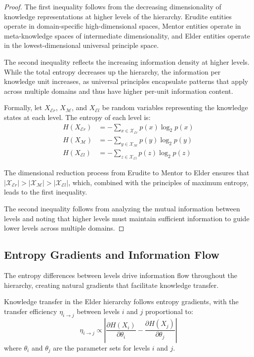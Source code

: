 \begin{proof}
The first inequality follows from the decreasing dimensionality of knowledge representations at higher levels of the hierarchy. Erudite entities operate in domain-specific high-dimensional spaces, Mentor entities operate in meta-knowledge spaces of intermediate dimensionality, and Elder entities operate in the lowest-dimensional universal principle space.

The second inequality reflects the increasing information density at higher levels. While the total entropy decreases up the hierarchy, the information per knowledge unit increases, as universal principles encapsulate patterns that apply across multiple domains and thus have higher per-unit information content.

Formally, let $X_{\mathcal{E}r}$, $X_{\mathcal{M}}$, and $X_{\mathcal{E}l}$ be random variables representing the knowledge states at each level. The entropy of each level is:
\begin{align}
H(X_{\mathcal{E}r}) &= -\sum_{x \in \mathcal{X}_{\mathcal{E}r}} p(x) \log_2 p(x) \\
H(X_{\mathcal{M}}) &= -\sum_{y \in \mathcal{X}_{\mathcal{M}}} p(y) \log_2 p(y) \\
H(X_{\mathcal{E}l}) &= -\sum_{z \in \mathcal{X}_{\mathcal{E}l}} p(z) \log_2 p(z)
\end{align}

The dimensional reduction process from Erudite to Mentor to Elder ensures that $|\mathcal{X}_{\mathcal{E}r}| > |\mathcal{X}_{\mathcal{M}}| > |\mathcal{X}_{\mathcal{E}l}|$, which, combined with the principles of maximum entropy, leads to the first inequality.

The second inequality follows from analyzing the mutual information between levels and noting that higher levels must maintain sufficient information to guide lower levels across multiple domains.
\end{proof}

\subsection{Entropy Gradients and Information Flow}

The entropy differences between levels drive information flow throughout the hierarchy, creating natural gradients that facilitate knowledge transfer.

\begin{theorem}
Knowledge transfer in the Elder hierarchy follows entropy gradients, with the transfer efficiency $\eta_{i \rightarrow j}$ between levels $i$ and $j$ proportional to:
\begin{equation}
\eta_{i \rightarrow j} \propto \left|\frac{\partial H(X_i)}{\partial \theta_i} - \frac{\partial H(X_j)}{\partial \theta_j}\right|
\end{equation}
where $\theta_i$ and $\theta_j$ are the parameter sets for levels $i$ and $j$.
\end{theorem}

